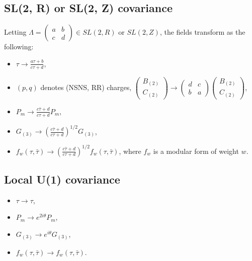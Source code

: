 \subsection{SL(2, R) or SL(2, Z) covariance}
Letting $\Lambda = \begin{pmatrix}a & b\\
c & d\end{pmatrix} \in SL(2, R)$ or $SL(2, Z)$, the fields transform as the following:
\begin{itemize}
    \item $\tau \to \frac{a\tau + b}{c\tau + d}$,
    \item $(p,q)$ denotes (NSNS, RR) charges,
    $\begin{pmatrix}B_{(2)}\\
        C_{(2)}
    \end{pmatrix} 
    \to \begin{pmatrix}
        d & c\\
        b & a
    \end{pmatrix}
\begin{pmatrix}
B_{(2)}\\
C_{(2)}\end{pmatrix}$,
    \item $P_m \to \frac{c\bar{\tau}+d}{c\tau+d} P_m$,
    \item $G_{(3)} \to \left(\frac{c\bar{\tau}+d}{c\tau+d}\right)^{1/2} G_{(3)}$,
    \item $f_w(\tau,\bar\tau) \to \left(\frac{c\bar{\tau}+d}{c\tau+d}\right)^{1/2} f_w(\tau,\bar\tau)$, where $f_w$ is a modular form of weight $w$.
\end{itemize}

\subsection{Local U(1) covariance}
\begin{itemize}
    \item $\tau \to \tau$,
    \item $P_m \to e^{2i\theta} P_m$,
    \item $G_{(3)} \to e^{i\theta} G_{(3)}$,
    \item $f_w(\tau,\bar\tau) \to f_w(\tau,\bar\tau)$.
\end{itemize}